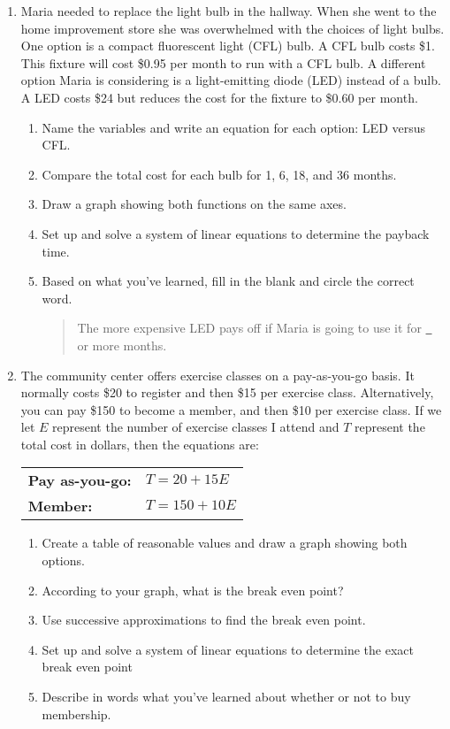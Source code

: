 \begin{enumerate}
\item Maria needed to replace the light bulb in the hallway.  When she went to the home improvement store she was overwhelmed with the choices of light bulbs.  One option is a compact fluorescent light  (CFL) bulb.  A CFL bulb costs \$1.  This fixture will cost \$0.95 per month to run with a CFL bulb.  A different option Maria is considering is a light-emitting diode (LED) instead of a bulb.  A LED costs \$24 but reduces the cost for the fixture to  \$0.60 per month.    
\begin{enumerate}
\item Name the variables and write an equation for each option: LED versus CFL.
\item Compare the total cost for each bulb for 1, 6, 18, and 36 months.
\item Draw a graph showing both functions on the same axes.
\item Set up and solve a system of linear equations to determine the payback time.
\item Based on what you've learned, fill in the blank and circle the correct word.
\begin{quote}
The more expensive LED pays off if Maria is going to use it for \underline{\quad~}  or more months.  
\end{quote}
\end{enumerate}

\item The community center offers exercise classes on a pay-as-you-go basis.  It normally costs \$20 to register and then \$15 per exercise class.  Alternatively, you can pay \$150 to become a member, and then \$10 per exercise class.  If we let $E$ represent the number of exercise classes I attend and $T$ represent the total cost in dollars, then the equations are:
\begin{center}
\begin{tabular} {ll}
\textbf{Pay as-you-go:} & $T = 20 + 15E$ \\
\textbf{Member:} & $T= 150 + 10E$ \\ 
\end{tabular}
\end{center}  
\begin{enumerate}
\item Create a table of reasonable values and draw a graph showing both options.
\item According to your graph, what is the break even point?  
\item Use successive approximations to find the break even point.
\item Set up and solve a system of linear equations to determine the exact break even point
\item Describe in words what you've learned about whether or not to buy membership.
\end{enumerate}


\end{enumerate}

